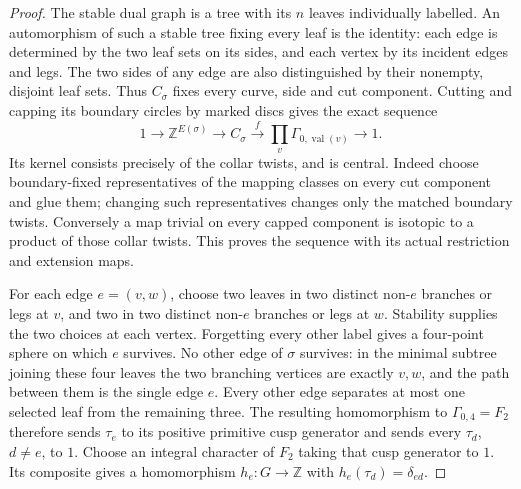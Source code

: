 \begin{proof}
The stable dual graph is a tree with its $n$ leaves individually
labelled.  An automorphism of such a stable tree fixing every
leaf is the identity: each edge is determined by the two leaf
sets on its sides, and each vertex by its incident edges and
legs.  The two sides of any edge are also distinguished by
their nonempty, disjoint leaf sets.  Thus $C_\sigma$ fixes every
curve, side and cut component.  Cutting and capping its boundary
circles by marked discs gives the exact sequence
\[
 1\longrightarrow\mathbb Z^{E(\sigma)}
 \longrightarrow C_\sigma
 \xrightarrow{\ f\ }
       \prod_{v}\Gamma_{0,\operatorname{val}(v)}
 \longrightarrow1.                                         \tag{E.171}
\]
Its kernel consists precisely of the collar twists, and is
central.  Indeed choose boundary-fixed representatives of the
mapping classes on every cut component and glue them; changing
such representatives changes only the matched boundary twists.
Conversely a map trivial on every capped component is isotopic
to a product of those collar twists.  This proves the sequence
with its actual restriction and extension maps.

For each edge $e=(v,w)$, choose two leaves in two distinct
non-$e$ branches or legs at $v$, and two in two distinct
non-$e$ branches or legs at $w$.  Stability supplies the two
choices at each vertex.  Forgetting every other label gives a
four-point sphere on which $e$ survives.  No other edge of
$\sigma$ survives: in the minimal subtree joining these four
leaves the two branching vertices are exactly $v,w$, and the
path between them is the single edge $e$.  Every other edge
separates at most one selected leaf from the remaining three.
The resulting homomorphism to $\Gamma_{0,4}=F_2$ therefore
sends $\tau_e$ to its positive primitive cusp generator and
sends every $\tau_d$, $d\ne e$, to $1$.  Choose an integral
character of $F_2$ taking that cusp generator to $1$.  Its
composite gives a homomorphism $h_e:G\to\mathbb Z$ with
$h_e(\tau_d)=\delta_{ed}$.


\end{proof}
